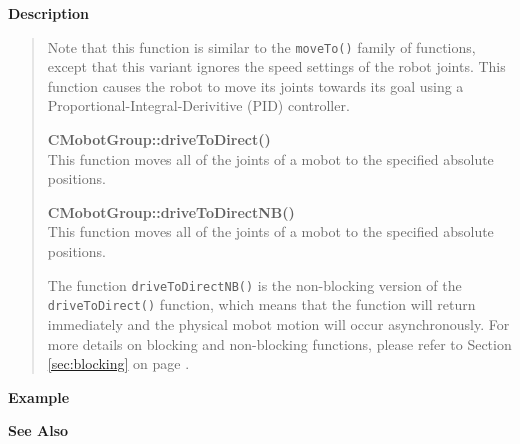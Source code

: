 {\bf Description}\\
\vspace{-12pt}
\begin{quote}
Note that this function is similar to the \texttt{moveTo()} family of functions, except
that this variant ignores the speed settings of the robot joints. This function causes
the robot to move its joints towards its goal using a Proportional-Integral-Derivitive (PID)
controller.

{\bf CMobotGroup::driveToDirect()}\\
This function moves all of the joints of a mobot to the specified absolute positions. 

{\bf CMobotGroup::driveToDirectNB()}\\
This function moves all of the joints of a mobot to the specified absolute positions. 

The function \texttt{driveToDirectNB()} is the non-blocking version of
the \texttt{driveToDirect()} function, which means that the function will return
immediately and the physical mobot motion will occur asynchronously. For
more details on blocking and non-blocking functions, please refer to 
Section \ref{sec:blocking} on page \pageref{sec:blocking}.\\
\end{quote}

\noindent
{\bf Example}\\
\noindent

\noindent
{\bf See Also}\\

